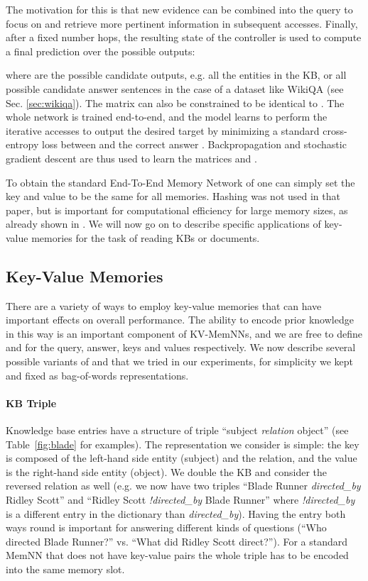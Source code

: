 \documentclass[11pt,letterpaper]{article}
\begin{document}
The motivation for this is that new evidence can be combined into the query to focus on and
retrieve more pertinent information in subsequent accesses.
Finally, after a fixed number  hops, the resulting state of the controller is used to compute a final prediction over the possible outputs:

where  are the possible candidate outputs, e.g. all the entities in the KB,
or all possible candidate answer sentences in the case of a dataset like {\sc WikiQA}
(see Sec. \ref{sec:wikiqa}).
The  matrix  can also be constrained to be identical to .
 The whole network is trained end-to-end, and the model
learns to perform the iterative accesses to output the desired target 
 by minimizing a standard cross-entropy
loss between  and the correct answer .
Backpropagation and stochastic gradient descent are thus used to learn the matrices
 and .


To obtain the standard End-To-End Memory Network of \cite{sukhbaatar2015end}
one can simply set the key and value to be the same for all memories.
Hashing was not used in that paper,
but is important for computational
efficiency for large memory sizes, as already shown
 in \cite{dodge2015evaluating}.
We will now go on to describe specific applications of
 key-value memories for the task of reading KBs or documents.


\subsection{Key-Value Memories} \label{sec:featuremap}

There are a variety of ways to employ key-value memories that can have important effects on overall performance.
The ability to encode prior knowledge in this way is an important
 component of KV-MemNNs, and we are free to define  and 
for the query, answer, keys and values respectively.
We now describe several possible variants of  and 
that we tried in our experiments,
for simplicity we kept  and   fixed as bag-of-words representations.

\paragraph{KB Triple}
Knowledge base entries have a structure of triple ``subject {\em relation} object'' (see Table~\ref{fig:blade} for examples).
The representation we consider is simple:
the key is composed of the left-hand side entity (subject) and the relation,
and the value is the right-hand side entity (object).
We double the KB and consider the reversed relation as well
(e.g. we now have two triples ``Blade Runner {\em directed\_by} Ridley Scott'' and
``Ridley Scott {\em !directed\_by} Blade Runner'' where {\em !directed\_by} is a
different entry in the dictionary than {\em directed\_by}). Having the entry both
ways round is important for answering different kinds of questions
(``Who directed Blade Runner?'' vs. ``What did Ridley Scott direct?'').
For a standard MemNN that does not have key-value pairs the whole triple has to
be encoded into the same memory slot.
\end{document}

